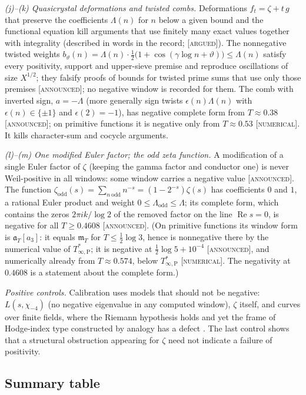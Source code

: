 \documentclass[11pt]{amsart}
\theoremstyle{definition}
\theoremstyle{remark}
\numberwithin{equation}{section}
\DeclareMathOperator{\Rel}{Re}
\newcommand{\mT}{\mathfrak{m}_T}                       %
\newcommand{\aT}{\mathfrak{a}_T}                       %
\newcommand{\Tarch}{T^{*}_{\infty,\mathrm P}}          %
\newcommand{\stag}[1]{\textsc{[#1]}}
\newcommand{\ARGUED}{\stag{argued}}
\newcommand{\NUM}{\stag{numerical}}
\newcommand{\ANNOUNCED}{\stag{announced}}
\newcommand{\entry}[1]{\par\smallskip\noindent\textit{#1.}\enspace}
\begin{document}
\entry{(j)--(k) Quasicrystal deformations and twisted combs} Deformations $f_t=\zeta+t\,g$ that preserve the
coefficients $\Lambda(n)$ for $n$ below a given bound and the functional equation kill arguments that use
finitely many exact values together with integrality (described in words in the record; \ARGUED). The
nonnegative twisted weights $b_\vartheta(n)=\Lambda(n)\cdot\frac12\big(1+\cos(\gamma\log n+\vartheta)\big)\le\Lambda(n)$
satisfy every positivity, support and upper-sieve premise and reproduce oscillations of size $X^{1/2}$; they
falsify proofs of bounds for twisted prime sums that use only those premises \ANNOUNCED; no negative window is
recorded for them. The comb with inverted sign, $a=-\Lambda$ (more generally sign twists
$\epsilon(n)\Lambda(n)$ with $\epsilon(n)\in\{\pm1\}$ and $\epsilon(2)=-1$), has negative complete form from
$T\approx0.38$ \ANNOUNCED; on primitive functions it is negative only from $T\approx0.53$ \NUM. It kills
character-sum and cocycle arguments.

\entry{(l)--(m) One modified Euler factor; the odd zeta function} A modification of a single Euler factor of
$\zeta$ (keeping the gamma factor and conductor one) is never Weil-positive in all windows: some window carries a
negative value \ANNOUNCED. The function
$\zeta_{\mathrm{odd}}(s)=\sum_{n\ \mathrm{odd}}n^{-s}=(1-2^{-s})\zeta(s)$ has coefficients $0$ and $1$, a
rational Euler product and weight $0\le\Lambda_{\mathrm{odd}}\le\Lambda$; its complete form, which contains the
zeros $2\pi ik/\log2$ of the removed factor on the line $\Rel s=0$, is negative for all $T\ge0.4608$
\ANNOUNCED. (On primitive functions its window form is $\aT[a_3]$: it equals $\mT$ for $T\le\frac12\log3$,
hence is nonnegative there by the numerical value of $\Tarch$; it is negative at $\frac12\log5+10^{-4}$
\ANNOUNCED, and numerically already from $T\approx0.574$, below $\Tarch$ \NUM. The negativity at $0.4608$ is a
statement about the complete form.)

\entry{Positive controls} Calibration uses models that should not be negative: $L(s,\chi_{-4})$ (no negative
eigenvalue in any computed window), $\zeta$ itself, and curves over finite fields, where the Riemann hypothesis
holds and yet the frame of Hodge-index type constructed by analogy has a defect \cite[Theorem~10.8]{P47}. The
last control shows that a structural obstruction appearing for $\zeta$ need not indicate a failure of
positivity.

\subsection{Summary table}\label{w3:subsec:table}
\end{document}
